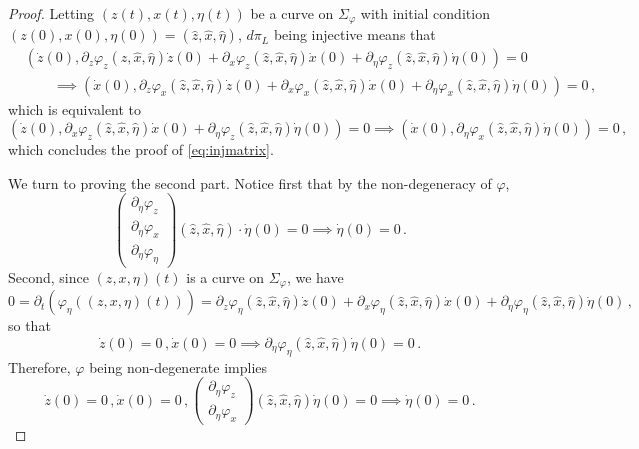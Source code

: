 \documentclass[
	fontsize=11pt, 
	twoside=false, 
	abstract=true, 
	a4paper,
]{scrartcl}
\newcommand{\del}{\partial}
\begin{document}
\begin{proof}
	Letting $(z(t), x(t),\eta(t))$ be a curve on $\Sigma_\varphi$ with initial condition $(z(0),x(0),\eta(0)) = (\hat z, \hat x, \hat \eta)$, $d\pi_L$ being injective means that
	\begin{align*}
		&{}(\dot z(0), \del_z\varphi_{z}(\hat z, \hat x, \hat \eta)\dot z(0)+ \del_x\varphi_{z}(\hat z, \hat x, \hat \eta)\dot x(0) +  \del_\eta\varphi_{z}(\hat z, \hat x, \hat \eta)\dot\eta(0)) = 0 \\
		&\qquad\implies (\dot x(0), \del_z\varphi_{x}(\hat z, \hat x, \hat \eta)\dot z(0)+ \del_x\varphi_{x}(\hat z, \hat x, \hat \eta)\dot x(0) +  \del_\eta\varphi_{x}(\hat z, \hat x, \hat \eta)\dot\eta(0)) = 0\,,
	\end{align*}
	which is equivalent to 
	\[
(\dot z(0), \del_x\varphi_{z}(\hat z, \hat x, \hat \eta)\dot x(0) +  \del_\eta\varphi_{z}(\hat z, \hat x, \hat \eta)\dot\eta(0)) = 0 \implies (\dot x(0), \del_\eta\varphi_{x}(\hat z, \hat x, \hat \eta)\dot\eta(0)) = 0\,,
	\]
	which concludes the proof of \cref{eq:injmatrix}.

	We turn to proving the second part. Notice first that by the non-degeneracy of $\varphi$,
	\[
		\begin{pmatrix}\del_\eta\varphi_z \\ \del_\eta\varphi_x \\ \del_\eta\varphi_\eta \end{pmatrix}(\hat z,\hat x,\hat\eta)\cdot \dot \eta(0) = 0 \implies \dot\eta(0)=0\,.
	\]
	Second, since $(z,x,\eta)(t)$ is a curve on $\Sigma_\varphi$, we have
	\[
		0 = \del_t(\varphi_\eta((z,x,\eta)(t))) = \del_z \varphi_\eta(\hat z,\hat x, \hat \eta) \dot z(0) + \del_x\varphi_\eta(\hat z,\hat x, \hat \eta)\dot x(0) + \del_\eta \varphi_\eta(\hat z,\hat x, \hat \eta) \dot \eta(0)\,,
	\]
	so that
	\[
		\dot z(0)=0\,,\dot x(0) = 0 \implies \del_\eta \varphi_\eta(\hat z, \hat x, \hat \eta) \dot \eta(0) = 0\,.
	\]
	Therefore, $\varphi$ being non-degenerate implies 
	\begin{equation}\label{eq:nondegenjustcheckxz}
		\dot z(0)=0\,, \dot x(0)=0\,, \begin{pmatrix}\del_\eta\varphi_z \\ \del_\eta\varphi_x\end{pmatrix}(\hat z,\hat x, \hat\eta)\dot \eta(0) = 0 \implies \dot\eta(0)=0\,.
	\end{equation}


\end{proof}
\end{document}
